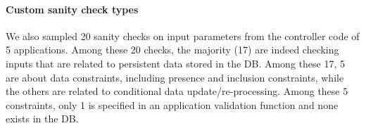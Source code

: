 \paragraph{\bf Custom sanity check types}

We also sampled 20 sanity checks on input parameters from the controller code of 5 applications.
Among these 20 checks, the majority (17) are indeed checking inputs  that are related to persistent
data stored in the DB. Among these 17, 5 are about
data constraints, including presence and inclusion constraints, 
while the others are related to conditional data update/re-processing.
 Among these 5 constraints, only 1 is specified
in an application validation function and none exists in the DB.

